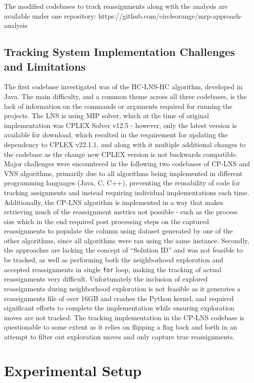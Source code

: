 \documentclass[a4paper,12pt]{Classes/RoboticsLaTeX}
\begin{document}
The modified codebases to track reassignments along with the analysis are available under one
repository: https://github.com/circleorange/mrp-approach-analysis


\section{Tracking System Implementation Challenges and Limitations}

The first codebase investigated was of the HC-LNS-HC algorithm,
developed in Java. The main difficulty, and a common theme across all
three codebases, is the lack of information on the commands or arguments
required for running the projects. The LNS is using MIP solver, which at
the time of original implementation was CPLEX Solver v12.5 - however,
only the latest version is available for download, which resulted in the
requirement for updating the dependency to CPLEX v22.1.1, and along with
it multiple additional changes to the codebase as the change new CPLEX
version is not backwards compatible. Major challenges were encountered
in the following two codebases of CP-LNS and VNS algorithms, primarily due
to all algorithms being implemented in different programming languages
(Java, C, C++), preventing the reusability of code for tracking
assignments and instead requiring individual implementations each time.
Additionally, the CP-LNS algorithm is implemented in a way that makes
retrieving much of the reassignment metrics not possible - such as the
process size which in the end required post processing steps on the
captured reassignments to populate the column using dataset generated by
one of the other algorithms, since all algorithms were ran using the
same instance. Secondly, the approaches are lacking the concept of
``Solution ID'' and was not feasible to be tracked, as well
as performing both the neighborhood exploration and accepted reassignments in single
\texttt{for} loop, making the tracking of actual reassignments very
difficult. Unfortunately the inclusion of explored reassignments during
neighborhood exploration is not feasible as it generates a reassignments
file of over 16GB and crashes the Python kernel, and required
significant efforts to complete the implementation while ensuring
exploration moves are not tracked. The tracking implementation in the
CP-LNS codebase is questionable to some extent as it relies on flipping
a flag back and forth in an attempt to filter out exploration moves and
only capture true reassignments.


\chapter{Experimental Setup} \label{chap:experiments}
\end{document}
